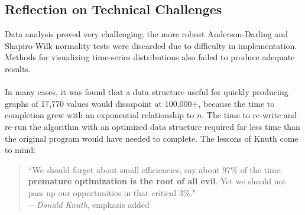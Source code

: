 \documentclass[prodmode,acmtecs]{acmsmall}
\begin{document}
\subsection{Reflection on Technical Challenges}
Data analysis proved very challenging; the more robust Anderson-Darling and Shapiro-Wilk normality tests were discarded due to difficulty in implementation. Methods for visualizing time-series distributions also failed to produce adequate results.
\\
\\
In many cases, it was found that a data structure useful for quickly producing graphs of 17,770 values would dissapoint at 100,000$+$, because the time to completion grew with an exponential relationship to $n$. The time to re-write and re-run the algorithm with an optimized data structure required far less time than the original program would have needed to complete. The lessons of Knuth come to mind:

\begin{quote}
``We should forget about small efficiencies, say about 97\% of the time: \textbf{premature optimization is the root of all evil}. Yet we should not pass up our opportunities in that critical 3\%."\\

\hspace{5em}---\textit{Donald Knuth}, emphasis added \cite{knuth-01}
\end{quote}

\medskip






\medskip
\end{document}
